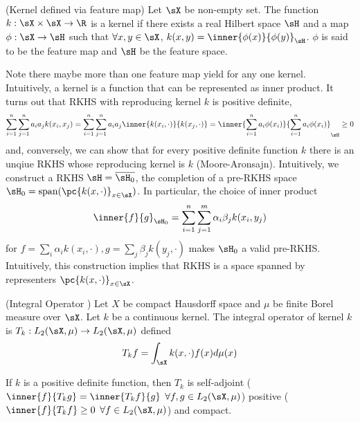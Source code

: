 \documentclass[11pt]{article}
\begin{document}
\begin{definition}
    (Kernel defined via feature map) Let $\sX$ be non-empty set. The function $k:\sX\times\sX\to\R$ is a kernel if there exists a real Hilbert space $\sH$ and a map $\phi:\sX\to\sH$ such that $\forall x,y\in\sX$, $k(x,y)=\inner{\phi(x)}{\phi(y)}_{\sH}$. $\phi$ is said to be the feature map and $\sH$  be the feature space.
\end{definition}

Note there maybe more than one feature map yield for any one kernel. Intuitively, a kernel is a function that can be represented as inner product. It turns out that RKHS with reproducing kernel $k$ is positive definite,
\begin{align}
    \sum_{i=1}^n \sum_{j=1}^n a_i a_j k(x_i,x_j)
        = \sum_{i=1}^n \sum_{j=1}^n a_i a_j \inner{k(x_i,\cdot)}{k(x_j,\cdot)}
        = \inner{\sum_{i=1}^n a_i \phi(x_i)}{\sum_{i=1}^n a_i \phi(x_i)}_{\sH}
        \geq 0
\end{align}
and, conversely, we can show that for every positive definite function $k$ there is an unqiue RKHS whose reproducing kernel is $k$ (Moore-Aronsajn). Intuitively, we construct a RKHS $\sH = \overline{\sH_0}$, the completion of a pre-RKHS space $\sH_0 = \text{span}(\pc{k(x,\cdot)}_{x\in\sX})$. In particular, the choice of inner product 
\begin{align}
    \inner{f}{g}_{\sH_0}
        = \sum_{i=1}^n\sum_{j=1}^m \alpha_i \beta_j k(x_i,y_j)
\end{align}
for $f = \sum_i \alpha_i k(x_i,\cdot), g = \sum_j \beta_j k(y_j,\cdot)$ makes $\sH_0$ a valid pre-RKHS. Intuitively, this construction implies that RKHS is a space spanned by representers $\pc{k(x,\cdot)}_{x\in\sX}$.



\begin{definition}
    (Integral Operator \cite{grettonWhatRKHS2012,muandetKernelMeanEmbedding2017}) Let $X$ be compact Hausdorff space and $\mu$ be finite Borel measure over $\sX$. Let $k$ be a continuous kernel. The integral operator of kernel $k$ is $T_k: L_2(\sX,\mu) \to L_2(\sX,\mu)$ defined 
    \begin{align}
        T_kf
            = \int_{\sX} k(x,\cdot) f(x) d\mu(x)
    \end{align}
\end{definition}

If $k$ is a positive definite function, then $T_k$ is self-adjoint ($\inner{f}{T_kg} = \inner{T_kf}{g}$ $\forall f,g\in L_2(\sX,\mu)$) positive ($\inner{f}{T_kf} \geq 0$ $\forall f\in L_2(\sX,\mu)$) and compact.
\end{document}
